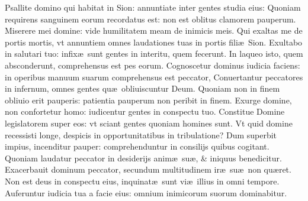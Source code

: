 \documentclass[a5paper,10pt]{book}
\def\ae{æ}
\begin{document}
\begin{multicols*}{2}
\newline \color{red} P\color{black}sallite domino qui habitat in Sion: annuntiate inter gentes studia eius:
\newline \color{red} Q\color{black}uoniam requirens sanguinem eorum recordatus est: non est oblitus clamorem pauperum.
\newline \color{red} M\color{black}iserere mei domine: vide humilitatem meam de inimicis meis.
\newline \color{red} Q\color{black}ui exaltas me de portis mortis, vt annuntiem omnes laudationes tuas in portis fili\ae \ Sion.
\newline \color{red} E\color{black}xultabo in salutari tuo: infix\ae \ sunt gentes in interitu, quem fecerunt.
\newline \color{red} I\color{black}n laqueo isto, quem absconderunt, comprehensus est pes eorum.
\newline \color{red} C\color{black}ognoscetur dominus iudicia faciens: in operibus manuum suarum comprehensus est peccator, %
\newline \color{red} C\color{black}onuertantur peccatores in infernum, omnes gentes qu\ae \ obliuiscuntur Deum.
\newline \color{red} Q\color{black}uoniam non in finem obliuio erit pauperis: patientia pauperum non peribit in finem.
\newline \color{red} E\color{black}xurge domine, non confortetur homo: iudicentur gentes in conspectu tuo.
\newline \color{red} C\color{black}onstitue Domine legislatorem super eos: vt sciant gentes quoniam homines sunt.
\newline \color{red} V\color{black}t quid domine recessisti longe, despicis in opportunitatibus in tribulatione?
\newline \color{red} D\color{black}um superbit impius, incenditur pauper: comprehenduntur in consilijs quibus cogitant.
\newline \color{red} Q\color{black}uoniam laudatur peccator in desiderijs anim\ae \ su\ae , \& iniquus benedicitur.
\newline \color{red} E\color{black}xacerbauit dominum peccator, secundum multitudinem ir\ae \ su\ae \ non qu\ae ret.
\newline \color{red} N\color{black}on est deus in conspectu eius, inquinat\ae \ sunt vi\ae \ illius in omni tempore.
\newline \color{red} A\color{black}uferuntur iudicia tua a facie eius: omnium inimicorum suorum dominabitur.

\end{multicols*}
\end{document}
